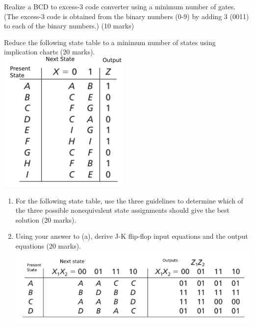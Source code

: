 \begin{prob}
  Realize a BCD to excess-3 code converter using a minimum number of gates.
  (The excess-3 code is obtained from the binary numbers (0-9) by adding 3 (0011)
  to each of the binary numbers.)
  (10 marks)
  \label{p:decoder}
\end{prob}

\begin{prob}
  Reduce the following state table to a minimum number of states using
  implication charts (20 marks).
  \\
  \includegraphics[width=0.3\linewidth]{./media/15.25-state-table.png}
\end{prob}

\begin{prob}
  \begin{enumerate}
  \item For the following state table, use the three guidelines to determine which
  of the three possible nonequivalent state assignments should give the best
  solution (20 marks).
  \item Using your answer to (a), derive J-K flip-flop input equations and the output
  equations (20 marks).\\
  \includegraphics[width=0.5\linewidth]{./media/15.23-state-table.png}
  \end{enumerate}
\end{prob}


